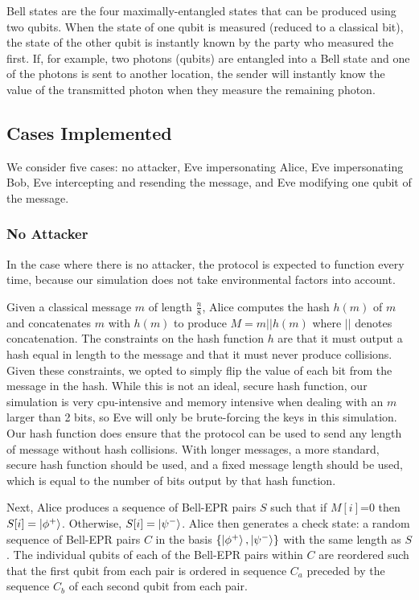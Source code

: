 \documentclass[conference,compsoc]{IEEEtran}
\begin{document}
Bell states are the four maximally-entangled states that can be produced
using two qubits. When the state of one qubit is measured (reduced
to a classical bit), the state of the other qubit is instantly known
by the party who measured the first. If, for example, two photons (qubits)
are entangled into a Bell state and one of the photons is sent to
another location, the sender will instantly know the value of the
transmitted photon when they measure the remaining photon. 

\subsection{Cases Implemented}

We consider five cases: no attacker, Eve impersonating Alice, Eve
impersonating Bob, Eve intercepting and resending the message, and Eve
modifying one qubit of the message.

\subsubsection{No Attacker}

In the case where there is no attacker, the protocol is expected
to function every time, because our simulation does not take environmental
factors into account.

Given a classical message $m$ of length $\frac{n}{8}$, Alice computes
the hash $h(m)$ of $m$ and concatenates $m$ with $h(m)$ to produce $M=m||h(m)$ where
$||$ denotes concatenation. The constraints
on the hash function $h$ are that it must output a hash equal in
length to the message and that it must never produce collisions. Given
these constraints, we opted to simply flip the value of each
bit from the message in the hash. While this is not an ideal, secure hash function,
our simulation is very cpu-intensive and memory intensive when dealing with an $m$ larger
than 2 bits, so Eve will only be brute-forcing the keys in this simulation.
Our hash function does ensure that the protocol can be used to send any
length of message without hash collisions.
With longer messages, a more standard, secure hash function should be used, and a fixed message length
should be used, which is equal to the number of bits output by that hash function.

Next, Alice produces a sequence of Bell-EPR pairs $S$ such that if $M[i]$=0 then $S[i]=\ket{\phi^{+}} $.
Otherwise, $S[i]=\ket{\psi^{-}} $. Alice then generates
a check state: a random sequence of Bell-EPR pairs $C$ in the basis $\left\{ \ket{\phi^{+}} ,\ket{\psi^{-}} \right\} $
with the same length as $S$. The individual qubits of each of the Bell-EPR pairs within $C$ are reordered such that
the first qubit from each pair is ordered in sequence $C_{a}$ preceded by the sequence $C_{b}$ of each second
qubit from each pair.
\end{document}

